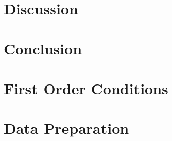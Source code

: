 \documentclass[12pt, a4paper, bibtotoc, liststotoc]{scrartcl}
\begin{document}
\section{Discussion}
\label{sec:discussion}

\section{Conclusion}
\label{sec:conclusion}





\newpage
\appendix
{}

\section{First Order Conditions}
\label{sec:first order conditions}

\section{Data Preparation}
\label{sec:data preparation}



\newpage

\nocite{von_gaudecker_templates_2019}
\printbibliography
\end{document}

